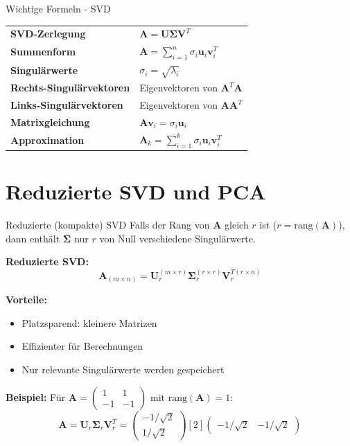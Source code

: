 \documentclass[a4paper, fontsize=7pt]{scrartcl}
\renewcommand*{\arraystretch}{1.5}
\begin{document}
\begin{mainbox}{Wichtige Formeln - SVD}
\renewcommand*{\arraystretch}{1.3}
\begin{tabularx}{\linewidth}{lX}
\textbf{SVD-Zerlegung} & $\mathbf{A} = \mathbf{U\Sigma V}^T$ \\[2mm]
\textbf{Summenform} & $\mathbf{A} = \sum_{i=1}^{n} \sigma_i\mathbf{u}_i\mathbf{v}_i^T$ \\[2mm]
\textbf{Singulärwerte} & $\sigma_i = \sqrt{\lambda_i}$ \\[2mm]
\textbf{Rechts-Singulärvektoren} & Eigenvektoren von $\mathbf{A}^T\mathbf{A}$ \\[2mm]
\textbf{Links-Singulärvektoren} & Eigenvektoren von $\mathbf{AA}^T$ \\[2mm]
\textbf{Matrixgleichung} & $\mathbf{A}\mathbf{v}_i = \sigma_i\mathbf{u}_i$ \\[2mm]
\textbf{Approximation} & $\mathbf{A}_k = \sum_{i=1}^{k} \sigma_i\mathbf{u}_i\mathbf{v}_i^T$
\end{tabularx}
\end{mainbox}

\section{Reduzierte SVD und PCA}

\begin{mainbox}{Reduzierte (kompakte) SVD}
Falls der Rang von $\mathbf{A}$ gleich $r$ ist ($r = \text{rang}(\mathbf{A})$), dann enthält $\mathbf{\Sigma}$ nur $r$ von Null verschiedene Singulärwerte.

\textbf{Reduzierte SVD:}
$$\mathbf{A}_{(m \times n)} = \mathbf{U}_r^{(m \times r)} \mathbf{\Sigma}_r^{(r \times r)} \mathbf{V}_r^{T(r \times n)}$$

\textbf{Vorteile:}
\begin{itemize}
    \item Platzsparend: kleinere Matrizen
    \item Effizienter für Berechnungen
    \item Nur relevante Singulärwerte werden gespeichert
\end{itemize}

\textbf{Beispiel:} Für $\mathbf{A} = \begin{pmatrix} 1 & 1 \\ -1 & -1 \end{pmatrix}$ mit $\text{rang}(\mathbf{A}) = 1$:
$$\mathbf{A} = \mathbf{U}_r \mathbf{\Sigma}_r \mathbf{V}_r^T = \begin{pmatrix} -1/\sqrt{2} \\ 1/\sqrt{2} \end{pmatrix} [2] \begin{pmatrix} -1/\sqrt{2} & -1/\sqrt{2} \end{pmatrix}$$
\end{mainbox}
\end{document}
